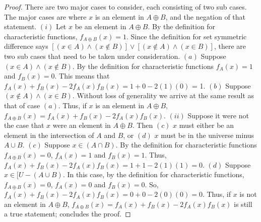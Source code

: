 \documentclass[a4paper, 12pt]{article}
\theoremstyle{plain}
\begin{document}
\begin{proof}
    There are two major cases to consider, each consisting of two sub cases. The major cases are 
    where $x$ is an element in $A \oplus B$, and the negation of that statement.
    \newline
    \newline
    $(i)$ Let $x$ be an element in $A \oplus B$. By the definition for \newline characteristic 
    functions, $f_{A \oplus B}(x) = 1$. Since the definition for set symmetric difference says 
    $[(x \in A) \land (x \notin B)] \lor [(x \notin A) \land (x \in B)]$, there are two sub cases 
    that need to be taken under consideration. \newline \newline \indent $(a)$ Suppose 
    $(x \in A) \land (x \notin B)$. By the definition for characteristic \indent functions 
    $f_{A}(x) = 1$ and $f_{B}(x) = 0$. This means that \newline \indent 
    $f_{A}(x) + f_{B}(x) - 2f_{A}(x)f_{B}(x) = 1 + 0 - 2(1)(0)$ = 1. 
    \newline \newline \indent $(b)$ Suppose $(x \notin A) \land (x \in B)$. Without loss of 
    generality we arrive \indent at the same result as that of case $(a)$.
    \newline
    \newline
    Thus, if $x$ is an element in $A \oplus B$, 
    $f_{A \oplus B}(x) = f_{A}(x) + f_{B}(x) - 2f_{A}(x)f_{B}(x)$.
    \newline
    \newline
    $(ii)$ Suppose it were not the case that $x$ were an element in $A \oplus B$. Then $(c)$ $x$ 
    must either be an element in the intersection of $A$ and $B$, or $(d)$ $x$ must be in the 
    universe minus $A \cup B$.
    \newline
    \newline \indent $(c)$ Suppose $x \in (A \cap B)$. By the definition for characteristic \newline 
    \indent functions $f_{A \oplus B}(x) = 0$, $f_{A}(x) = 1$ and $f_{B}(x) = 1$. Thus, \newline 
    \indent $f_{A}(x) + f_{B}(x) - 2f_{A}(x)f_{B}(x) = 1 + 1 - 2(1)(1) = 0$.
    \newline \newline \indent $(d)$ Suppose $x \in [U - (A \cup B)$. In this case, by the definition 
    for \newline \indent characteristic functions, $f_{A \oplus B}(x) = 0$, $f_{A}(x) = 0$ and 
    $f_{B}(x) = 0$. So, \indent $f_{A}(x) + f_{B}(x) - 2f_{A}(x)f_{B}(x) = 0 + 0 - 2(0)(0) = 0$.
    \newline
    \newline
    Thus, if $x$ is not an element in $A \oplus B$, 
    $f_{A \oplus B}(x) = f_{A}(x) + f_{B}(x) - 2f_{A}(x)f_{B}(x)$ is still a true statement; 
    concludes the proof.
\end{proof}
\end{document}
